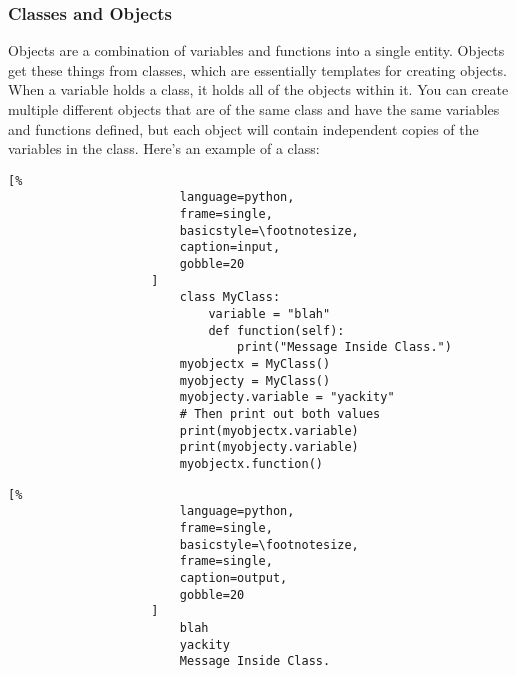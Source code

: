\documentclass[crop=false,class=book,oneside]{standalone}
\begin{document}
            \subsubsection{Classes and Objects}
                Objects are a combination of variables and functions into
                a single entity. Objects get these things from classes,
                which are essentially templates for creating objects.
                When a variable holds a class, it holds all of the
                objects within it. You can create multiple different
                objects that are of the same class and have the same
                variables and functions defined, but each object will
                contain independent copies of the variables in the class.
                Here's an example of a class:\newline
                \begin{minipage}[t]{.48\textwidth}
                    \centering
                    \begin{lstlisting}[%
                        language=python,
                        frame=single,
                        basicstyle=\footnotesize,
                        caption=input,
                        gobble=20
                    ]
                        class MyClass:
                            variable = "blah"
                            def function(self):
                                print("Message Inside Class.")
                        myobjectx = MyClass()
                        myobjecty = MyClass()
                        myobjecty.variable = "yackity"
                        # Then print out both values
                        print(myobjectx.variable)
                        print(myobjecty.variable)
                        myobjectx.function()
                    \end{lstlisting}
                \end{minipage}\hfill
                \begin{minipage}[t]{.48\textwidth}
                    \centering
                    \begin{lstlisting}[%
                        language=python,
                        frame=single,
                        basicstyle=\footnotesize,
                        frame=single,
                        caption=output,
                        gobble=20
                    ]
                        blah
                        yackity
                        Message Inside Class.
                    \end{lstlisting}
                \end{minipage}
\end{document}
